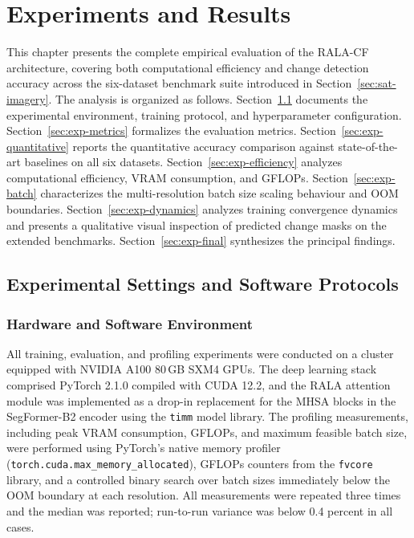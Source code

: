 \chapter{Experiments and Results}
\label{chap:experiments}

This chapter presents the complete empirical evaluation of the \ac{RALA-CF} architecture, covering both computational efficiency and change detection accuracy across the six-dataset benchmark suite introduced in Section~\ref{sec:sat-imagery}. The analysis is organized as follows. Section~\ref{sec:exp-settings} documents the experimental environment, training protocol, and hyperparameter configuration. Section~\ref{sec:exp-metrics} formalizes the evaluation metrics. Section~\ref{sec:exp-quantitative} reports the quantitative accuracy comparison against state-of-the-art baselines on all six datasets. Section~\ref{sec:exp-efficiency} analyzes computational efficiency, \ac{VRAM} consumption, and \ac{GFLOPs}. Section~\ref{sec:exp-batch} characterizes the multi-resolution batch size scaling behaviour and \ac{OOM} boundaries. Section~\ref{sec:exp-dynamics} analyzes training convergence dynamics and presents a qualitative visual inspection of predicted change masks on the extended benchmarks. Section~\ref{sec:exp-final} synthesizes the principal findings.


\section{Experimental Settings and Software Protocols}
\label{sec:exp-settings}

\subsection{Hardware and Software Environment}

All training, evaluation, and profiling experiments were conducted on a cluster equipped with NVIDIA A100 80\,GB SXM4 \ac{GPU}s. The deep learning stack comprised PyTorch 2.1.0 compiled with CUDA 12.2, and the \ac{RALA} attention module was implemented as a drop-in replacement for the \ac{MHSA} blocks in the SegFormer-B2 encoder using the \texttt{timm} model library. The profiling measurements, including peak \ac{VRAM} consumption, \ac{GFLOPs}, and maximum feasible batch size, were performed using PyTorch's native memory profiler (\texttt{torch.cuda.max\_memory\_allocated}), \ac{GFLOPs} counters from the \texttt{fvcore} library, and a controlled binary search over batch sizes immediately below the \ac{OOM} boundary at each resolution. All measurements were repeated three times and the median was reported; run-to-run variance was below 0.4 percent in all cases.

